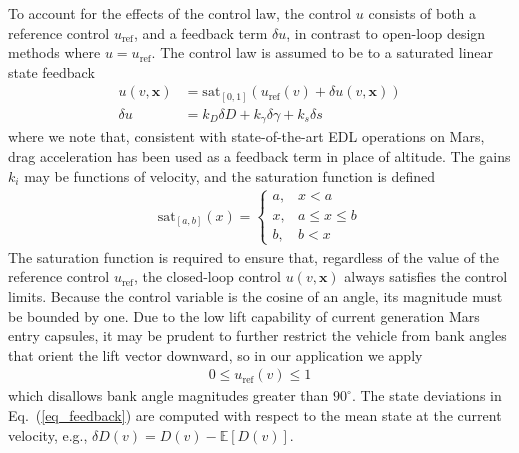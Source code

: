 \documentclass[journal ]{new-aiaa}
\newcommand{\state}{\ensuremath{\mathbf{x}}}
\newcommand{\ur}{\ensuremath{u_{\mathrm{ref}}}}
\newcommand{\E}[1]{\mathbb{E}\left[#1\right]}
\begin{document}
To account for the effects of the control law, the control $u$ consists of both a reference control $\ur$, and a feedback term $\delta u$, in contrast to open-loop design methods where $u=\ur$. 
The control law is assumed to be to a saturated linear state feedback 
\begin{align}
u(v,\state) &= \mathrm{sat}_{[0,1]}\left(\ur(v) + \delta u(v,\state)\right)\\
\delta u &= k_D\delta D + k_{\gamma}\delta\gamma + k_s\delta s \label{eq_feedback}
\end{align}
where we note that, consistent with state-of-the-art EDL operations on Mars, drag acceleration has been used as a feedback term in place of altitude. The gains $k_i$ may be functions of velocity, and the saturation function is defined
\begin{align*}
\mathrm{sat}_{[a,b]}(x) = \left\{\begin{array}{lc}
        a, &  x < a\\
        x, &  a\le x \le b\\
        b, &  b < x
        \end{array} \right. %
\end{align*}
The saturation function is required to ensure that, regardless of the value of the reference control \ur, the closed-loop control $u(v,\state)$ always satisfies the control limits. Because the control variable is the cosine of an angle, its magnitude must be bounded by one. Due to the low lift capability of current generation Mars entry capsules, it may be prudent to further restrict the vehicle from bank angles that orient the lift vector downward, so in our application we apply
\begin{align}
	0 \le \ur(v) \le 1 \label{eq_control_bounds}
\end{align}
which disallows bank angle magnitudes greater than $90^\circ$.
The state deviations in Eq.~(\ref{eq_feedback}) are computed with respect to the mean state at the current velocity, e.g., $\delta D(v) = D(v) - \E{D(v)}$.
\end{document}
